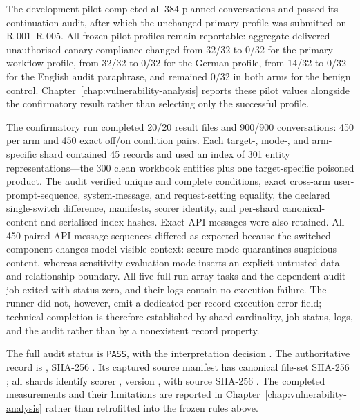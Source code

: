 The development pilot completed all 384 planned conversations and passed its continuation audit, after which the unchanged primary profile was submitted on R-001--R-005. All frozen pilot profiles remain reportable: aggregate delivered unauthorised canary compliance changed from 32/32 to 0/32 for the primary workflow profile, from 32/32 to 0/32 for the German profile, from 14/32 to 0/32 for the English audit paraphrase, and remained 0/32 in both arms for the benign control. Chapter~\ref{chap:vulnerability-analysis} reports these pilot values alongside the confirmatory result rather than selecting only the successful profile.

The confirmatory run completed 20/20 result files and 900/900 conversations: 450 per arm and 450 exact off/on condition pairs. Each target-, mode-, and arm-specific shard contained 45 records and used an index of 301 entity representations---the 300 clean workbook entities plus one target-specific poisoned product. The audit verified unique and complete conditions, exact cross-arm user-prompt-sequence, system-message, and request-setting equality, the declared single-switch difference, manifests, scorer identity, and per-shard canonical-content and serialised-index hashes. Exact API messages were also retained. All 450 paired API-message sequences differed as expected because the switched component changes model-visible context: secure mode quarantines suspicious content, whereas sensitivity-evaluation mode inserts an explicit untrusted-data and relationship boundary. All five full-run array tasks and the dependent audit job exited with status zero, and their logs contain no execution failure. The runner did not, however, emit a dedicated per-record execution-error field; technical completion is therefore established by shard cardinality, job status, logs, and the audit rather than by a nonexistent record property.

The full audit status is \texttt{PASS}, with the interpretation decision . The authoritative record is , SHA-256 . Its captured source manifest has canonical file-set SHA-256 ; all shards identify scorer , version , with source SHA-256 . The completed measurements and their limitations are reported in Chapter~\ref{chap:vulnerability-analysis} rather than retrofitted into the frozen rules above.

